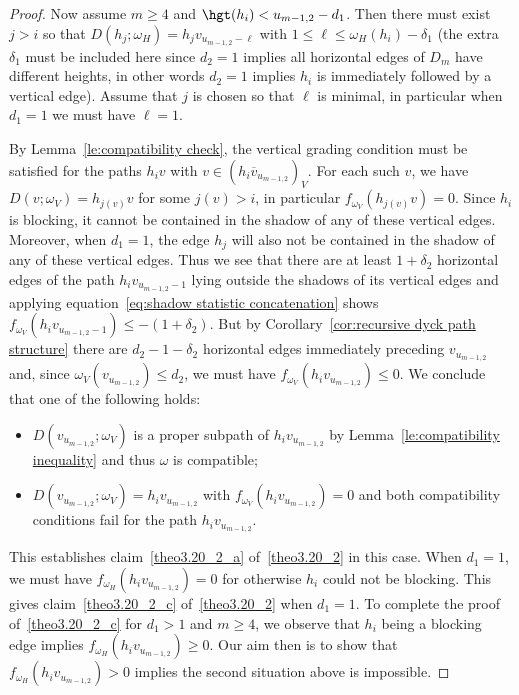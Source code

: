 \begin{proof}
 Now assume $m\ge4$ and $\hgt(h_i)<u_{m-1,2}-d_1$. Then there must exist $j>i$ so that $D(h_j;\omega_H)=h_jv_{u_{m-1,2}-\ell}$ with $1\le\ell\le\omega_H(h_i)-\delta_1$
 (the extra $\delta_1$ must be included here since $d_2=1$ implies all horizontal edges of $D_m$ have different heights, in other words $d_2=1$ implies $h_i$ is immediately followed by a vertical edge). 
 Assume that $j$ is chosen so that $\ell$ is minimal, in particular when $d_1=1$ we must have $\ell=1$.

 By Lemma~\ref{le:compatibility check}, the vertical grading condition must be satisfied for the paths $h_iv$ with $v\in(h_i\overline{v}_{u_{m-1,2}})_V$.
 For each such $v$, we have $D(v;\omega_V)=h_{j(v)}v$ for some $j(v)>i$, in particular $f_{\omega_V}(h_{j(v)}v)=0$. 
 Since $h_i$ is blocking, it cannot be contained in the shadow of any of these vertical edges.
 Moreover, when $d_1=1$, the edge $h_j$ will also not be contained in the shadow of any of these vertical edges. 
 Thus we see that there are at least $1+\delta_2$ horizontal edges of the path $h_iv_{u_{m-1,2}-1}$ lying outside the shadows of its vertical edges and applying equation~\eqref{eq:shadow statistic concatenation} shows $f_{\omega_V}(h_iv_{u_{m-1,2}-1})\le-(1+\delta_2)$.
 But by Corollary~\ref{cor:recursive dyck path structure} there are $d_2-1-\delta_2$ horizontal edges immediately preceding $v_{u_{m-1,2}}$ and, since $\omega_V(v_{u_{m-1,2}})\le d_2$, we must have $f_{\omega_V}(h_iv_{u_{m-1,2}})\le0$. 
 We conclude that one of the following holds:
 \begin{itemize}
 \item $D(v_{u_{m-1,2}};\omega_V)$ is a proper subpath of $h_iv_{u_{m-1,2}}$ by Lemma~\ref{le:compatibility inequality} and thus $\omega$ is compatible;
 \item $D(v_{u_{m-1,2}};\omega_V)=h_iv_{u_{m-1,2}}$ with $f_{\omega_V}(h_iv_{u_{m-1,2}})=0$ and both compatibility conditions fail for the path $h_iv_{u_{m-1,2}}$.
 \end{itemize}
 This establishes claim~\ref{theo3.20_2_a} of~\ref{theo3.20_2} in this case. 
 When $d_1=1$, we must have $f_{\omega_H}(h_iv_{u_{m-1,2}})=0$ for otherwise $h_i$ could not be blocking.
 This gives claim~\ref{theo3.20_2_c} of~\ref{theo3.20_2} when $d_1=1$. 
 To complete the proof of~\ref{theo3.20_2_c} for $d_1>1$ and $m\ge4$, we observe that $h_i$ being a blocking edge implies $f_{\omega_H}(h_iv_{u_{m-1,2}})\ge0$.
 Our aim then is to show that $f_{\omega_H}(h_iv_{u_{m-1,2}})>0$ implies the second situation above is impossible.


\end{proof}
